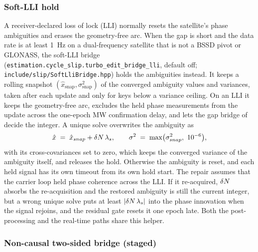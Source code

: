 \documentclass[main.tex]{subfiles}
\begin{document}
\subsubsection{Soft-LLI hold}\label{sec:slip-te-softlli}

A receiver-declared loss of lock (LLI) normally resets the satellite's phase
ambiguities and erases the geometry-free arc.  When the gap is short and the
data rate is at least \SI{1}{Hz} on a dual-frequency satellite that is not a
BSSD pivot or GLONASS, the soft-LLI bridge
(\texttt{estimation.cycle\_slip.turbo\_edit\_bridge\_lli}, default off;
\texttt{include/slip/SoftLliBridge.hpp}) holds the ambiguities instead.  It
keeps a rolling snapshot $(\hat x_{\mathrm{snap}}, \sigma^2_{\mathrm{snap}})$
of the converged ambiguity values and variances, taken after each update and
only for keys below a variance ceiling.  On an LLI it keeps the
geometry-free arc, excludes the held phase measurements from the update
across the one-epoch MW confirmation delay, and lets the gap bridge of
 decide the integer.  A unique solve overwrites the
ambiguity as
\begin{equation}
\hat x \;=\; \hat x_{\mathrm{snap}} + \slipd N\,\lambda_\sigl,
\qquad \sigma^2 \;=\; \max\bigl(\sigma^2_{\mathrm{snap}},\ 10^{-6}\bigr),
\end{equation}
with its cross-covariances set to zero, which keeps the converged variance of
the ambiguity itself, and releases the hold.  Otherwise the ambiguity is
reset, and each held signal has its own timeout from its own hold start.  The repair assumes that the carrier loop held phase coherence
across the LLI.  If it re-acquired, $\delta N$ absorbs the re-acquisition
and the restored ambiguity is still the current integer, but a wrong unique
solve puts at least $\lvert\delta N\,\lambda_s\rvert$ into the phase
innovation when the signal rejoins, and the residual gate resets it one
epoch late.  Both the post-processing and the real-time paths share this
helper.

\subsubsection{Non-causal two-sided bridge (staged)}\label{sec:slip-te-noncausal}
\end{document}
